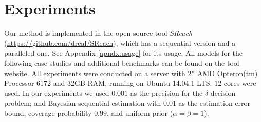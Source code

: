\section{Experiments}
Our method is implemented in the open-source tool {\it SReach} (\url{https://github.com/dreal/SReach}), which has a sequential version and a paralleled one. See Appendix \ref{apndx:usage} for its usage. All models for the following case studies and additional benchmarks can be found on the tool website. All experiments were conducted on a server with 2* AMD Opteron(tm) Processor 6172 and 32GB RAM, running on Ubuntu 14.04.1 LTS. 12 cores were used. In our experiments we used $0.001$ as the precision for the $\delta$-decision problem; and Bayesian sequential estimation with $0.01$ as the estimation error bound, coverage probability $0.99$, and uniform prior ($\alpha = \beta = 1$).

